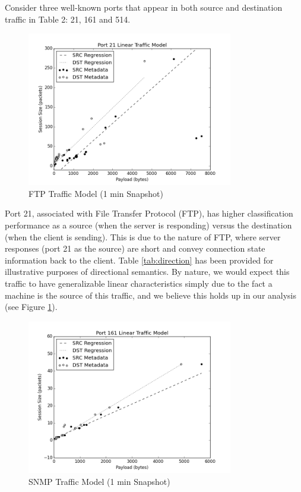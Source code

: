 Consider three well-known ports that appear in both source and destination traffic in Table 2: 21, 161 and 514.

\begin{figure}[!htb]
	\centering
	\includegraphics[width=9cm]{paperplots/21.png}
	\caption{FTP Traffic Model (1 min Snapshot)}
	\label{fig:21}
\end{figure}

Port 21, associated with File Transfer Protocol (FTP), has higher classification performance as a source (when the server is responding) versus the destination (when the client is sending). This is due to the nature of FTP, where server responses (port 21 as the source) are short and convey connection state information back to the client. Table \ref{tab:direction} has been provided for illustrative purposes of directional semantics. By nature, we would expect this traffic to have generalizable linear characteristics simply due to the fact a machine is the source of this traffic, and we believe this holds up in our analysis (see Figure \ref{fig:21}).

\begin{figure}[!htb]
	\centering
	\includegraphics[width=9cm]{paperplots/161.png}
	\caption{SNMP Traffic Model (1 min Snapshot)}
	\label{fig:161}
\end{figure}

